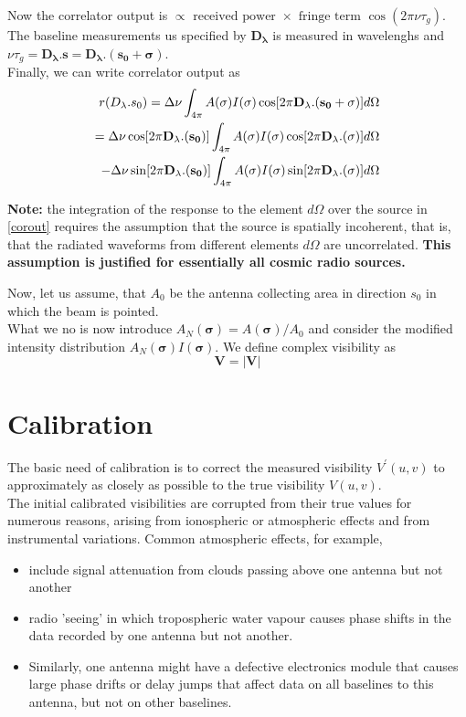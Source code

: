 \documentclass[10pt]{report}
\newcommand{\mbf}[1]{\mathbf{#1}}
\newcommand{\cbox}{tcolorbox}
\begin{document}
Now the correlator output is $\propto \text{ received power } \times \text{ fringe term } \cos(2 \pi \nu \tau_g)$.\\
The baseline measurements us specified by $\mbf{D_\lambda}$ is measured in wavelenghs and $\nu \tau_g=\mbf{D_\lambda.s}=\mbf{D_\lambda.(s_0+\sigma)}$.\\
Finally, we can write correlator output as
\begin{eqnarray}
r(D_\lambda.s_0) = \Delta \nu \int_{4 \pi} A(\mbf{\sigma})I(\mbf{\sigma})\cos[2 \pi \mbf{D_\lambda.(s_0+\sigma)}]d\Omega\\
=  \Delta \nu \cos[2 \pi \mbf{D_\lambda.(s_0)}]\int_{4 \pi} A(\mbf{\sigma})I(\mbf{\sigma})\cos[2 \pi \mbf{D_\lambda.(\sigma)}]d\Omega \notag\\ 
-  \Delta \nu \sin[2 \pi \mbf{D_\lambda.(s_0)}]\int_{4 \pi} A(\mbf{\sigma})I(\mbf{\sigma})\sin[2 \pi \mbf{D_\lambda.(\sigma)}]d\Omega \label{corout}
\end{eqnarray}
\begin{\cbox}
\textbf{Note:} the integration of the response to the element $d \Omega$ over the source in \eqref{corout}  requires the assumption that the source is spatially incoherent, that is, that the radiated waveforms from different elements $d\Omega$ are uncorrelated. \textbf{This assumption is justified for essentially all cosmic radio sources.} 

\end{\cbox}
Now, let us assume, that $A_0$  be the antenna collecting area in direction $s_0$ in which the beam is pointed.\\
What we no is now introduce $A_N(\mbf{\sigma})=A(\mbf{\sigma})/A_0$ and consider the modified intensity distribution $A_N(\mbf{\sigma})I(\mbf{\sigma})$. We define complex visibility as 
\begin{equation}
\mbf{V}=|\mbf{V}|
\end{equation}


\section{Calibration}
The basic need of calibration is to correct the measured visibility $V^\prime(u,v)$ to approximately as closely as possible to the true visibility $V(u,v)$.\\

The initial calibrated visibilities are corrupted from their true values for numerous reasons, arising from ionospheric or atmospheric effects and from instrumental variations. Common atmospheric effects, for example,
\begin{itemize}
\item include signal attenuation from clouds passing above one antenna but not another
\item radio 'seeing' in which tropospheric water vapour causes phase shifts in the data recorded by one antenna but not another.  
\item Similarly, one antenna might have a defective electronics module that causes large phase drifts or delay jumps that affect data on all baselines to this antenna, but not on other baselines. 
\end{itemize}
\end{document}
